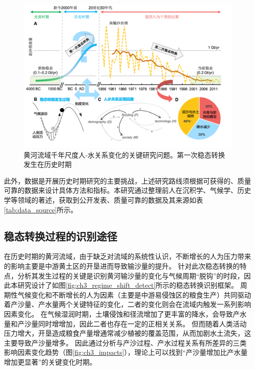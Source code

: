 \begin{figure}[H] %
    \centering
    \includegraphics[width=\textwidth]{img/ch3/ch3_why_regime_shift.png}
    \caption[黄河流域千年尺度人-水关系变化的关键研究问题]{黄河流域千年尺度人-水关系变化的关键研究问题。第一次稳态转换发生在历史时期}
    \label{fig:ch3_why_regime_shift}
\end{figure}

此外，数据是开展历史时期研究的主要挑战，上述研究路线须根据可获得的、质量可靠的数据来设计具体方法和指标。本研究通过整理前人在沉积学、气候学、历史学等领域的著述，获取到公开发表、质量可靠的数据及其来源如表\ref{tab:data_source}所示。




\subsection{稳态转换过程的识别途径}

在历史时期的黄河流域，由于缺乏对流域的系统性认识，不断增长的人为压力带来的影响主要是中游黄土区的开垦进而导致输沙量的提升\cite{wu2020a}。
针对此次稳态转换的特点，分析其发生过程的关键是识别黄河输沙量的变化与气候周期“脱钩”的时段，因此本研究设计了如图\ref{fig:ch3_regime_shift_detect}所示的稳态转换识别框架。
周期性气候变化和不断增长的人为因素（主要是中游易侵蚀区的粮食生产）共同驱动着产沙量、产水量两个关键特征的变化，二者的变化则会在流域内触发一系列影响因素变化。
在气候湿润时期，土壤侵蚀和径流增加了更丰富的降水，会导致产水量和产沙量同时增增加，因此二者也存在一定的正相关关系。
但而随着人类活动压力增大，开垦造成粮食产量增通常减少植被的覆盖范围，从而加剧水土流失，这主要导致产沙量增多。
因此通过分析与产沙过程、产水过程关系有所差异的三类影响因素变化趋势（图\ref{fig:ch3_impacts}），理论上可以找到“产沙量增加比产水量增加更显著”的关键变化时期。

